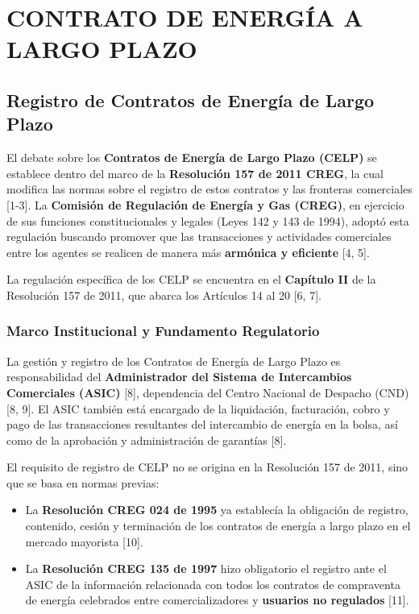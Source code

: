 \documentclass[a5paper]{book}%
\begin{document}
\chapter{CONTRATO DE ENERGÍA A LARGO PLAZO}


\section{Registro de Contratos de Energía de Largo Plazo}

El debate sobre los \textbf{Contratos de Energía de Largo Plazo (CELP)} se establece dentro del marco de la \textbf{Resolución 157 de 2011 CREG}, la cual modifica las normas sobre el registro de estos contratos y las fronteras comerciales [1-3]. La \textbf{Comisión de Regulación de Energía y Gas (CREG)}, en ejercicio de sus funciones constitucionales y legales (Leyes 142 y 143 de 1994), adoptó esta regulación buscando promover que las transacciones y actividades comerciales entre los agentes se realicen de manera más \textbf{armónica y eficiente} [4, 5].

La regulación específica de los CELP se encuentra en el \textbf{Capítulo II} de la Resolución 157 de 2011, que abarca los Artículos 14 al 20 [6, 7].

\subsection{Marco Institucional y Fundamento Regulatorio}

La gestión y registro de los Contratos de Energía de Largo Plazo es responsabilidad del \textbf{Administrador del Sistema de Intercambios Comerciales (ASIC)} [8], dependencia del Centro Nacional de Despacho (CND) [8, 9]. El ASIC también está encargado de la liquidación, facturación, cobro y pago de las transacciones resultantes del intercambio de energía en la bolsa, así como de la aprobación y administración de garantías [8].

El requisito de registro de CELP no se origina en la Resolución 157 de 2011, sino que se basa en normas previas:
\begin{itemize}
	\item La \textbf{Resolución CREG 024 de 1995} ya establecía la obligación de registro, contenido, cesión y terminación de los contratos de energía a largo plazo en el mercado mayorista [10].
	\item La \textbf{Resolución CREG 135 de 1997} hizo obligatorio el registro ante el ASIC de la información relacionada con todos los contratos de compraventa de energía celebrados entre comercializadores y \textbf{usuarios no regulados} [11].
\end{itemize}
\end{document}
